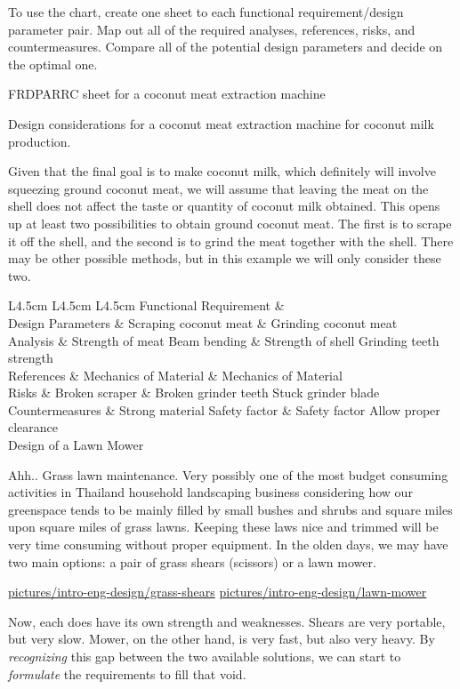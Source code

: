 \documentclass[a4paper,openany,12pt]{book}
\begin{document}
To use the chart, create one sheet to each functional requirement/design
parameter pair. Map out all of the required analyses, references, risks,
and countermeasures. Compare all of the potential design parameters and
decide on the optimal one.

FRDPARRC sheet for a coconut meat extraction machine

Design considerations for a coconut meat extraction machine for coconut
milk production.

Given that the final goal is to make coconut milk, which definitely will
involve squeezing ground coconut meat, we will assume that leaving the
meat on the shell does not affect the taste or quantity of coconut milk
obtained. This opens up at least two possibilities to obtain ground
coconut meat. The first is to scrape it off the shell, and the second is
to grind the meat together with the shell. There may be other possible
methods, but in this example we will only consider these two.

 L4.5cm L4.5cm L4.5cm Functional Requirement \&\\
Design Parameters \& Scraping coconut meat \& Grinding coconut meat\\
Analysis \& Strength of meat Beam bending \& Strength of shell Grinding
teeth strength\\
References \& Mechanics of Material \& Mechanics of Material\\
Risks \& Broken scraper \& Broken grinder teeth Stuck grinder blade\\
Countermeasures \& Strong material Safety factor \& Safety factor Allow
proper clearance\\

Design of a Lawn Mower

Ahh.. Grass lawn maintenance. Very possibly one of the most budget
consuming activities in Thailand household landscaping business
considering how our greenspace tends to be mainly filled by small bushes
and shrubs and square miles upon square miles of grass lawns. Keeping
these laws nice and trimmed will be very time consuming without proper
equipment. In the olden days, we may have two main options: a pair of
grass shears (scissors) or a lawn mower.


\url{pictures/intro-eng-design/grass-shears}
\url{pictures/intro-eng-design/lawn-mower}

Now, each does have its own strength and weaknesses. Shears are very
portable, but very slow. Mower, on the other hand, is very fast, but
also very heavy. By \emph{recognizing} this gap between the two available
solutions, we can start to \emph{formulate} the requirements to fill that
void.
\end{document}
